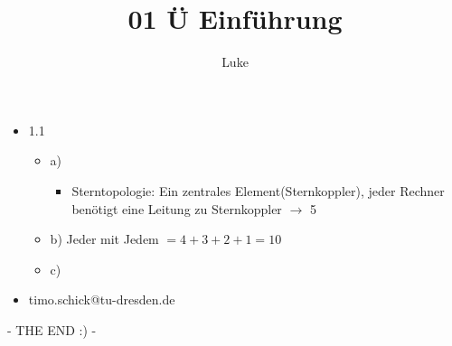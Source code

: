 \documentclass[a4paper, 12pt] {article} %
\title{01 Ü Einführung}
\begin{document}
\maketitle
\author{Luke}

\begin{itemize}
\item 1.1
\begin{itemize}
	\item a)
	\begin{itemize}
		\item Sterntopologie: Ein zentrales Element(Sternkoppler), jeder 			Rechner benötigt eine Leitung zu Sternkoppler \(\to\) 5
	\end{itemize}
	\item b) Jeder mit Jedem \(= 4+3+2+1=10\)
	\item c) 
\end{itemize}
\item timo.schick@tu-dresden.de
\end{itemize}



- THE END  :) - 

\begin{lstlisting}

\end{lstlisting}
\end{document}
